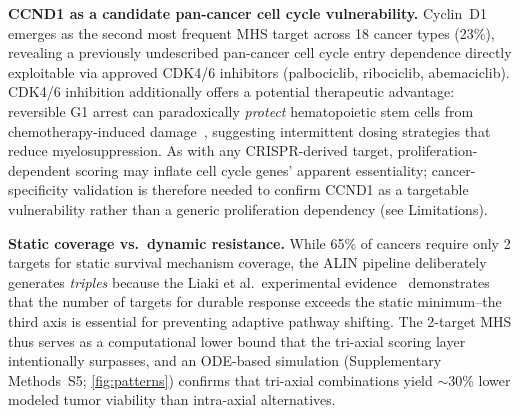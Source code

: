 \documentclass[times, twoside, watermark]{zHenriquesLab-StyleBioRxiv}
\begin{document}
\textbf{CCND1 as a candidate pan-cancer cell cycle vulnerability.} Cyclin~D1 emerges as the second most frequent MHS target across 18 cancer types (23\%), revealing a previously undescribed pan-cancer cell cycle entry dependence directly exploitable via approved CDK4/6 inhibitors (palbociclib, ribociclib, abemaciclib). CDK4/6 inhibition additionally offers a potential therapeutic advantage: reversible G1 arrest can paradoxically \emph{protect} hematopoietic stem cells from chemotherapy-induced damage~\cite{Roberts2012}, suggesting intermittent dosing strategies that reduce myelosuppression. As with any CRISPR-derived target, proliferation-dependent scoring may inflate cell cycle genes' apparent essentiality; cancer-specificity validation is therefore needed to confirm CCND1 as a targetable vulnerability rather than a generic proliferation dependency (see Limitations).

\textbf{Static coverage vs.\ dynamic resistance.} While 65\% of cancers require only 2 targets for static survival mechanism coverage, the ALIN pipeline deliberately generates \emph{triples} because the Liaki et al.\ experimental evidence~\cite{Liaki2025} demonstrates that the number of targets for durable response exceeds the static minimum--the third axis is essential for preventing adaptive pathway shifting. The 2-target MHS thus serves as a computational lower bound that the tri-axial scoring layer intentionally surpasses, and an ODE-based simulation (Supplementary Methods~S5; \cref{fig:patterns}) confirms that tri-axial combinations yield $\sim$30\% lower modeled tumor viability than intra-axial alternatives.
\end{document}
